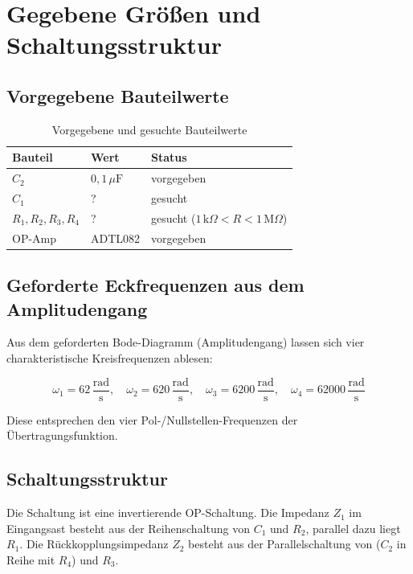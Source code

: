 \documentclass[12pt,a4paper]{article}
\begin{document}
\section{Gegebene Größen und Schaltungsstruktur}

\subsection{Vorgegebene Bauteilwerte}

\begin{table}[H]
  \centering
  \caption{Vorgegebene und gesuchte Bauteilwerte}
  \begin{tabular}{lll}
    \toprule
    Bauteil & Wert & Status \\
    \midrule
    $C_2$ & $0{,}1\,\mu\text{F}$ & vorgegeben \\
    $C_1$ & ? & gesucht \\
    $R_1, R_2, R_3, R_4$ & ? & gesucht ($1\,\text{k}\Omega < R < 1\,\text{M}\Omega$) \\
    OP-Amp & ADTL082 & vorgegeben \\
    \bottomrule
  \end{tabular}
\end{table}

\subsection{Geforderte Eckfrequenzen aus dem Amplitudengang}

Aus dem geforderten Bode-Diagramm (Amplitudengang) lassen sich vier charakteristische
Kreisfrequenzen ablesen:

\[
  \omega_1 = 62\,\frac{\text{rad}}{\text{s}}, \quad
  \omega_2 = 620\,\frac{\text{rad}}{\text{s}}, \quad
  \omega_3 = 6200\,\frac{\text{rad}}{\text{s}}, \quad
  \omega_4 = 62000\,\frac{\text{rad}}{\text{s}}
\]

Diese entsprechen den vier Pol-/Nullstellen-Frequenzen der Übertragungsfunktion.

\subsection{Schaltungsstruktur}

Die Schaltung ist eine invertierende OP-Schaltung. Die Impedanz $Z_1$ im
Eingangsast besteht aus der Reihenschaltung von $C_1$ und $R_2$, parallel dazu liegt
$R_1$. Die Rückkopplungsimpedanz $Z_2$ besteht aus der Parallelschaltung von
($C_2$ in Reihe mit $R_4$) und $R_3$.
\end{document}
